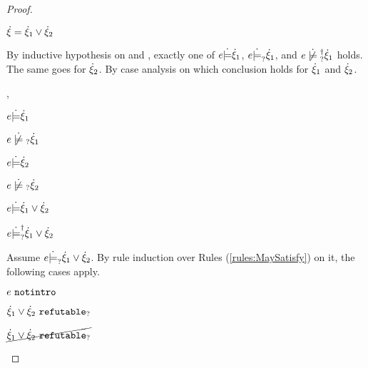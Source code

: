 \begin{proof}
\begin{byCases}
\item[\text{(\ref{rule:CTOr})}]
    \begin{pfsteps*}
    \item $\dot{\xi}=\dot{\xi}_1 \vee \dot{\xi}_2$ 
    \end{pfsteps*}
    By inductive hypothesis on  and , exactly one of $e \dot{\models} \dot{\xi}_1$, $e \dot{\models}_{?} \dot{\xi}_1$, and $\cnotsatisfyormay{e}{\hxi_1}$ holds. The same goes for $\dot{\xi}_2$. By case analysis on which conclusion holds for $\dot{\xi}_1$ and $\dot{\xi}_2$.
    \begin{byCases}
    \item[\csatisfy{e}{\hxi_1},\csatisfy{e}{\hxi_2}]
        \begin{pfsteps*}
        \item $e \dot{\models} \dot{\xi}_1$  
        \item $\cnotmaysatisfy{e}{\hxi_1}$  
        \item $e \dot{\models} \dot{\xi}_2$  
        \item $\cnotmaysatisfy{e}{\hxi_2}$  
        \item $e \dot{\models} \dot{\xi}_1 \vee \dot{\xi}_2$  
        \item $e \dot{\models}_{?}^{\dag} \dot{\xi}_1 \vee \dot{\xi}_2$ 
        \end{pfsteps*}
        Assume $e \dot{\models}_{?} \dot{\xi}_1 \vee \dot{\xi}_2$. By rule induction over Rules (\ref{rules:MaySatisfy}) on it, the following cases apply.
        \begin{byCases}
        \item[\text{(\ref{rule:CMSNotIntro})}]
            \begin{pfsteps*}
            \item $e ~\mathtt{notintro}$  
            \item $\dot{\xi}_1 \vee \dot{\xi}_2 ~\mathtt{refutable}_?$  
            \item $\cancel{\dot{\xi}_1 \vee \dot{\xi}_2 ~\mathtt{refutable}_?}$  
            \end{pfsteps*}

\end{byCases}
\end{byCases}
\end{byCases}
\end{proof}
